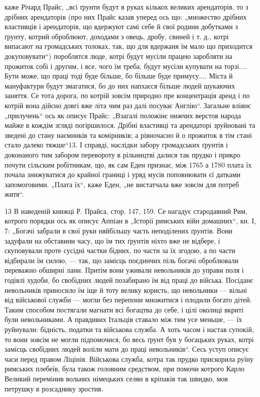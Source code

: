 каже Річард Прайс, „всі ґрунти будут в руках кількох великих арендаторів, то з дрібних арендаторів (про них Прайс казав уперед ось що: „множество дрібних властивців і арендаторів, що вдержуют самі себе й свої родини добутками з ґрунту, котрий оброблюют, доходами з овець, дробу, свиней і т. д., котрі випасают на громадських толоках, так, що для вдержаня їм мало що приходится докуповувати“) пороблятся люде, котрі будут мусіли працею заробляти на прожиток собі і другим, і все, чого їм треба, будут мусіли
купувати на торзі.... Бути може, що праці тоді буде більше, бо більше буде примусу.... Міста й мануфактури будут змагатися, бо до них напхаєся більше людей шукаючих заняття. Се тота дорога, по котрій зовсім природно пре концентрація аренд і по котрій вона дійсно довгі вже літа чим раз далі посуває Англію“. Загальне вліянє „прилучень“ ось як описує Прайс: „Взагалі положінє нижчих верстов народа майже в кождім згляді погіршилося. Дрібні властивці та арендаторі зруйновані та зведені до стану наємннків та комірників; а рівночасно й о прожиток в тім стані стало далеко тяжше“13. І справді, наслідки забору громадських ґрунтів і доконаного тим забором перевороту в рільництві далися так прудко і прикро почути сільским робітникам, що, як сам Еден признає, між 1765 а 1780 плата їх почала знижуватися до крайної границі і уряд мусів поповнювати єї датками запомоговими. „Плата їх“, каже Еден, „не вистатчала вже зовсім для потреб житя“.

13 В наведеній книжці Р. Прайса, стор. 147, 159. Се нагадує стародавний Рим, котрого порядки ось як описує Аппіан в „Історії римських війн домашних“, кн. І, 7: „Богачі забрали в свої руки няйбільшу часть
неподілених ґрунтів. Вони задуфали на обставини часу, що їм тих ґрунтів ніхто вже не відбере, і скуповували проте сусідні частки бідних, по
части за їх згодою, а по части відбирали їм силою, — так, що замісць
поєдинчих  піль богачі оброблювали переважно обширні лани. Притім
вони уживали невольників до управи поля і годівлі худоби, бо свобідних
людей позабирано  їм від праці до війська. Посіданє невольників приносило їм іще й тоту велику користь, що невольники — вільні від військової служби — могли без перепони множитися і плодили богато дітей. Таким способом постягали магнати всі богацтва до себе, і цілі околиці вкриті були невольниками. А правдивих Італьців ставало між тим усе меньше, — їх руйнували: бідність, податки та військова служба. А хоть часом і настав супокій, то вони зовсім не могли підпомочися, бо весь ґрунт був у богацьких руках, котрі замісць свобідних людей воліли мати до праці невольників“. Сесь уступ описує часи перед правом Ліцінія. Військова служба, котра так прудко прискорила руїну римських плебеїв, була також головним средством, при помочи котрого Карло Великий перемінив вольних німецьких селян в кріпаків так швидко, мов петрушку в розсаднику зростив.
